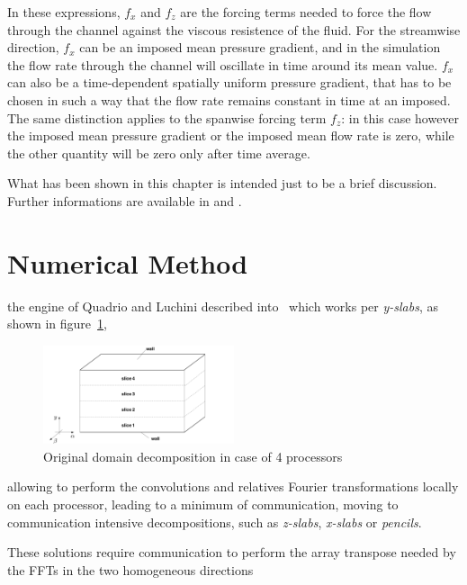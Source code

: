  In these expressions, $f_{x}$ and $f_{z}$ are the forcing terms needed to force the flow through the channel against the viscous resistence of the fluid. For the streamwise direction, $f_{x}$ can be an imposed mean pressure gradient, and in the simulation the flow rate through the channel will oscillate in time around its mean value. $f_{x}$ can also be a time-dependent spatially uniform pressure gradient, that has to be chosen in such a way that the flow rate remains constant in time at an imposed. The same distinction applies to the spanwise forcing term $f_{z}$: in this case however the imposed mean pressure gradient or the imposed mean flow rate is zero, while the other quantity will be zero only after time average.


\par
What has been shown in this chapter is intended just to be a brief discussion. Further informations are available in \cite[1-7]{ns:quadrio} and \cite{cpl:presentazione}.







\section{Numerical Method}
the engine of Quadrio and Luchini described into~\cite{cpl:presentazione} which works per \emph{y-slabs}, as shown in figure~\ref{domain_decomp},
\begin{figure}
\centering
\includegraphics[width=0.5\textwidth]{grafici/decomp_dominio_cpl}
\caption{Original domain decomposition in case of 4 processors}
\label{domain_decomp}
\end{figure} allowing to perform the convolutions and relatives Fourier transformations locally on each processor, leading to a minimum of communication, moving to communication intensive decompositions, such as \emph{z-slabs}, \emph{x-slabs} or \emph{pencils}.

These solutions require communication to perform the array transpose needed by the FFTs in the two homogeneous directions